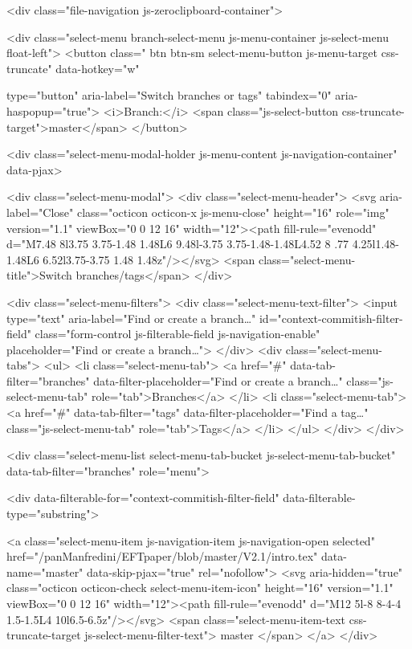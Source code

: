 <div class="file-navigation js-zeroclipboard-container">
  
<div class="select-menu branch-select-menu js-menu-container js-select-menu float-left">
  <button class=" btn btn-sm select-menu-button js-menu-target css-truncate" data-hotkey="w"
    
    type="button" aria-label="Switch branches or tags" tabindex="0" aria-haspopup="true">
      <i>Branch:</i>
      <span class="js-select-button css-truncate-target">master</span>
  </button>

  <div class="select-menu-modal-holder js-menu-content js-navigation-container" data-pjax>

    <div class="select-menu-modal">
      <div class="select-menu-header">
        <svg aria-label="Close" class="octicon octicon-x js-menu-close" height="16" role="img" version="1.1" viewBox="0 0 12 16" width="12"><path fill-rule="evenodd" d="M7.48 8l3.75 3.75-1.48 1.48L6 9.48l-3.75 3.75-1.48-1.48L4.52 8 .77 4.25l1.48-1.48L6 6.52l3.75-3.75 1.48 1.48z"/></svg>
        <span class="select-menu-title">Switch branches/tags</span>
      </div>

      <div class="select-menu-filters">
        <div class="select-menu-text-filter">
          <input type="text" aria-label="Find or create a branch…" id="context-commitish-filter-field" class="form-control js-filterable-field js-navigation-enable" placeholder="Find or create a branch…">
        </div>
        <div class="select-menu-tabs">
          <ul>
            <li class="select-menu-tab">
              <a href="#" data-tab-filter="branches" data-filter-placeholder="Find or create a branch…" class="js-select-menu-tab" role="tab">Branches</a>
            </li>
            <li class="select-menu-tab">
              <a href="#" data-tab-filter="tags" data-filter-placeholder="Find a tag…" class="js-select-menu-tab" role="tab">Tags</a>
            </li>
          </ul>
        </div>
      </div>

      <div class="select-menu-list select-menu-tab-bucket js-select-menu-tab-bucket" data-tab-filter="branches" role="menu">

        <div data-filterable-for="context-commitish-filter-field" data-filterable-type="substring">


            <a class="select-menu-item js-navigation-item js-navigation-open selected"
               href="/panManfredini/EFTpaper/blob/master/V2.1/intro.tex"
               data-name="master"
               data-skip-pjax="true"
               rel="nofollow">
              <svg aria-hidden="true" class="octicon octicon-check select-menu-item-icon" height="16" version="1.1" viewBox="0 0 12 16" width="12"><path fill-rule="evenodd" d="M12 5l-8 8-4-4 1.5-1.5L4 10l6.5-6.5z"/></svg>
              <span class="select-menu-item-text css-truncate-target js-select-menu-filter-text">
                master
              </span>
            </a>
        </div>

